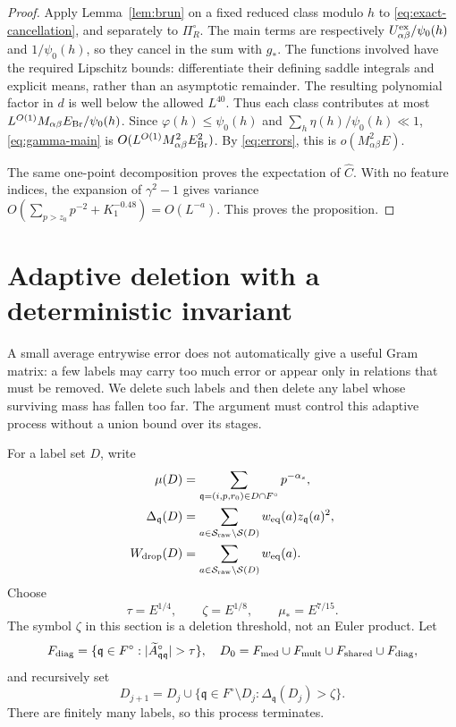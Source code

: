 \begin{proof}
Apply Lemma~\ref{lem:brun} on a fixed reduced class modulo \(h\)
to \eqref{eq:exact-cancellation}, and separately to
\(\Pi_R^\circ\).  The main terms are respectively
\(U^{\rm ex}_{\alpha\beta}/\psi_0(h)\) and
\(1/\psi_0(h)\), so they cancel in the sum with \(g_*\).
The functions involved have the required Lipschitz bounds:
differentiate their defining saddle integrals and explicit means,
rather than an asymptotic remainder.  The resulting polynomial
factor in \(d\) is well below the allowed \(L^{40}\).
Thus each class contributes at most
\(L^{O(1)}M_{\alpha\beta}E_{\rm Br}/\psi_0(h)\).
Since \(\varphi(h)\le\psi_0(h)\) and
\(\sum_h\eta(h)/\psi_0(h)\ll1\),
\eqref{eq:gamma-main} is
\(O(L^{O(1)}M_{\alpha\beta}^2E_{\rm Br}^2)\).
By \eqref{eq:errors}, this is \(o(M_{\alpha\beta}^2E)\).

The same one-point decomposition proves the expectation of
\(\widehat C\).  With no feature indices, the expansion of
\(\gamma^2-1\) gives variance
\(O(\sum_{p>z_0}p^{-2}+K_1^{-0.48})=O(L^{-a})\).
This proves the proposition.
\end{proof}

\section{Adaptive deletion with a deterministic invariant}
\label{sec:peeling}

A small average entrywise error does not automatically give a useful
Gram matrix: a few labels may carry too much error or appear only in
relations that must be removed.  We delete such labels and then delete
any label whose surviving mass has fallen too far.  The argument must
control this adaptive process without a union bound over its stages.

For a label set \(D\), write
\begin{align*}
 \mu(D)&=\sum_{\mathfrak q=(i,p,r_0)\in D\cap F^\circ}p^{-\alpha_s},\\
 \Delta_{\mathfrak q}(D)&=
   \sum_{a\in\mathcal S_{\rm raw}\setminus\mathcal S(D)}
             w_{\rm eq}(a)z_{\mathfrak q}(a)^2,\\
 W_{\rm drop}(D)&=
   \sum_{a\in\mathcal S_{\rm raw}\setminus\mathcal S(D)}w_{\rm eq}(a).
\end{align*}
Choose
\begin{equation}\label{eq:peel-thresholds}
 \tau=E^{1/4},\qquad \zeta=E^{1/8},\qquad \mu_*=E^{7/15}.
\end{equation}
The symbol \(\zeta\) in this section is a deletion threshold, not
an Euler product.  Let
\[
 F_{\rm diag}=\{\mathfrak q\in F^\circ:
                  |\widetilde A^\circ_{\mathfrak q\mathfrak q}|>\tau\},
 \quad
 D_0=F_{\rm med}\cup F_{\rm mult}\cup F_{\rm shared}\cup F_{\rm diag},
\]
and recursively set
\begin{equation}\label{eq:peel-process}
 D_{j+1}=D_j\cup
       \{\mathfrak q\in F^\circ\setminus D_j:
                               \Delta_{\mathfrak q}(D_j)>\zeta\}.
\end{equation}
There are finitely many labels, so this process terminates.

